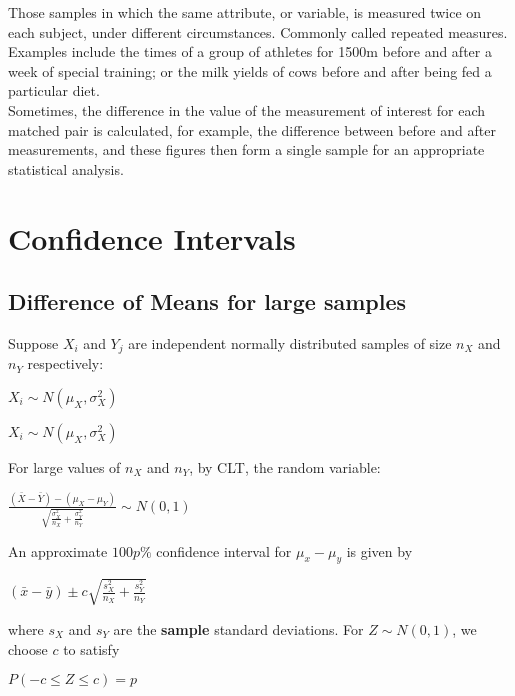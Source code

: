         Those samples in which the same attribute, or variable, is measured twice on each subject, under different circumstances. Commonly called repeated measures. Examples include the times of a group of athletes for 1500m before and after a week of special training; or the milk yields of cows before and after being fed a particular diet.\\

        Sometimes, the difference in the value of the measurement of interest for each matched pair is calculated, for example, the difference between before and after measurements, and these figures then form a single sample for an appropriate statistical analysis.

  \section{Confidence Intervals}
    \subsection{Difference of Means for large samples}
      Suppose $X_i$ and $Y_j$ are independent normally distributed samples of size $n_X$ and $n_Y$ respectively:
      \begin{center}
        $X_i \sim N(\mu_X, \sigma^2_X)$
      \end{center}
      \begin{center}
        $X_i \sim N(\mu_X, \sigma^2_X)$
      \end{center}
      For large values of $n_X$ and $n_Y$, by CLT, the random variable:
      \begin{center}
        $\frac{(\bar{X} - \bar{Y}) - (\mu_X - \mu_Y)}{\sqrt{\frac{\sigma_X^2}{n_X} + \frac{\sigma^2_Y}{n_Y}}} \sim N(0, 1)$
      \end{center}

      An approximate $100p\%$ confidence interval for $\mu_x - \mu_y$ is given by
      \begin{center}
        $ (\bar{x} - \bar{y}) \pm c \sqrt{ \frac{s^2_X}{n_X} + \frac{s^2_Y}{n_Y} } $
      \end{center}
      where $s_X$ and $s_Y$ are the \textbf{sample} standard deviations. For $Z \sim N(0, 1)$, we choose $c$ to satisfy
      \begin{center}$P(-c \le Z \le c) = p$\end{center}

